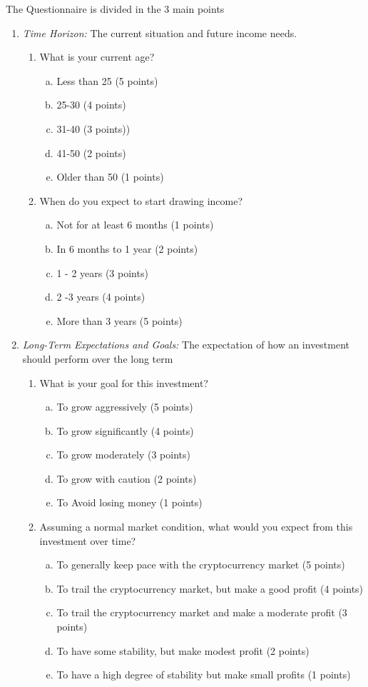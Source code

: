 \documentclass[	DIV=calc,%
							paper=letter,%
							fontsize=12pt%
                            ]{scrartcl}	 					%
\begin{document}
The Questionnaire is divided in the 3 main points  
\begin{enumerate}[-]
  \item \textit{Time Horizon:} The current situation and future income needs.
  \begin{enumerate}[1.]
    \item What is your current age?
    \begin{enumerate}[a)]
      \item Less than 25 (5 points)
      \item 25-30 (4 points)
      \item 31-40 (3 points))
      \item 41-50 (2 points)
      \item Older than 50 (1 points) 
    \end{enumerate}
    \item When do you expect to start drawing income?
    \begin{enumerate}[a)]
      \item Not for at least 6 months (1 points) 
      \item In 6 months to 1 year (2 points)
      \item 1 - 2 years (3 points)
      \item 2 -3 years (4 points)
      \item More than 3 years (5 points) 
    \end{enumerate}
  \end{enumerate}
 \item \textit{Long-Term Expectations and Goals:} The expectation of how an investment should perform over the long term
  \begin{enumerate}[1.]
    \item What is your goal for this investment?
    \begin{enumerate}[a)]
      \item To grow aggressively (5 points)
      \item To grow significantly (4 points)
      \item To grow moderately (3 points)
      \item To grow with caution (2 points)
      \item To Avoid losing money (1 points) 
    \end{enumerate}
    
    \item Assuming a normal market condition, what would you expect from this investment over time?
    \begin{enumerate}[a)]
      \item To generally keep pace with the cryptocurrency market (5 points)
      \item To trail the cryptocurrency market, but make a good profit (4 points)
      \item To trail the cryptocurrency market and make a moderate profit (3 points)
      \item To have some stability, but make modest profit (2 points)
      \item To have a high degree of stability but make small profits (1 points) 
    \end{enumerate}
  

\end{enumerate}
\end{enumerate}
\end{document}
